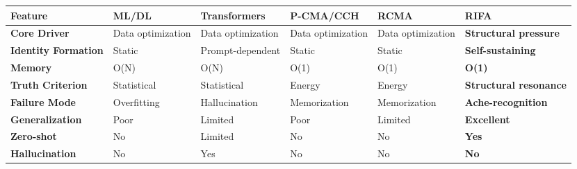 \documentclass[
  11pt,
  a4paper,
]{article}
\begin{document}
\begin{longtable}[]{@{}
  >{\raggedright\arraybackslash}p{}
  >{\raggedright\arraybackslash}p{}
  >{\raggedright\arraybackslash}p{}
  >{\raggedright\arraybackslash}p{}
  >{\raggedright\arraybackslash}p{}
  >{\raggedright\arraybackslash}p{}@{}}
\toprule\noalign{}
\begin{minipage}[b]{\linewidth}\raggedright
Feature
\end{minipage} & \begin{minipage}[b]{\linewidth}\raggedright
ML/DL
\end{minipage} & \begin{minipage}[b]{\linewidth}\raggedright
Transformers
\end{minipage} & \begin{minipage}[b]{\linewidth}\raggedright
P-CMA/CCH
\end{minipage} & \begin{minipage}[b]{\linewidth}\raggedright
RCMA
\end{minipage} & \begin{minipage}[b]{\linewidth}\raggedright
RIFA
\end{minipage} \\
\midrule\noalign{}
\endhead
\bottomrule\noalign{}
\endlastfoot
\textbf{Core Driver} & Data optimization & Data optimization & Data
optimization & Data optimization & \textbf{Structural pressure} \\
\textbf{Identity Formation} & Static & Prompt-dependent & Static &
Static & \textbf{Self-sustaining} \\
\textbf{Memory} & O(N) & O(N) & O(1) & O(1) & \textbf{O(1)} \\
\textbf{Truth Criterion} & Statistical & Statistical & Energy & Energy &
\textbf{Structural resonance} \\
\textbf{Failure Mode} & Overfitting & Hallucination & Memorization &
Memorization & \textbf{Ache-recognition} \\
\textbf{Generalization} & Poor & Limited & Poor & Limited &
\textbf{Excellent} \\
\textbf{Zero-shot} & No & Limited & No & No & \textbf{Yes} \\
\textbf{Hallucination} & No & Yes & No & No & \textbf{No} \\
\end{longtable}
\end{document}
